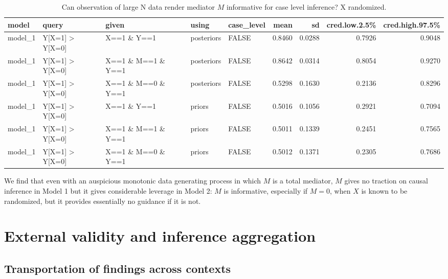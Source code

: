 \documentclass[
  12pt,
]{book}
\begin{document}
\begin{table}

\caption{\label{tab:unnamed-chunk-110}Can observation of large N data render mediator $M$ informative for case level inference? X randomized.}
\centering
\begin{tabular}[t]{l|l|l|l|l|r|r|r|r}
\hline
model & query & given & using & case\_level & mean & sd & cred.low.2.5\% & cred.high.97.5\%\\
\hline
model\_1 & Y[X=1] > Y[X=0] & X==1 \& Y==1 & posteriors & FALSE & 0.8460 & 0.0288 & 0.7926 & 0.9048\\
\hline
model\_1 & Y[X=1] > Y[X=0] & X==1 \& M==1 \& Y==1 & posteriors & FALSE & 0.8642 & 0.0314 & 0.8054 & 0.9270\\
\hline
model\_1 & Y[X=1] > Y[X=0] & X==1 \& M==0 \& Y==1 & posteriors & FALSE & 0.5298 & 0.1630 & 0.2136 & 0.8296\\
\hline
model\_1 & Y[X=1] > Y[X=0] & X==1 \& Y==1 & priors & FALSE & 0.5016 & 0.1056 & 0.2921 & 0.7094\\
\hline
model\_1 & Y[X=1] > Y[X=0] & X==1 \& M==1 \& Y==1 & priors & FALSE & 0.5011 & 0.1339 & 0.2451 & 0.7565\\
\hline
model\_1 & Y[X=1] > Y[X=0] & X==1 \& M==0 \& Y==1 & priors & FALSE & 0.5012 & 0.1371 & 0.2305 & 0.7686\\
\hline
\end{tabular}
\end{table}

We find that even with an auspicious monotonic data generating process in which \(M\) is a total mediator, \(M\) gives no traction on causal inference in Model 1 but it gives considerable leverage in Model 2: \(M\) is informative, especially if \(M=0\), when \(X\) is known to be randomized, but it provides essentially no guidance if it is not.

\hypertarget{external-validity-and-inference-aggregation}{%
\chapter{External validity and inference aggregation}\label{external-validity-and-inference-aggregation}}

\hypertarget{transportation-of-findings-across-contexts}{%
\section{Transportation of findings across contexts}\label{transportation-of-findings-across-contexts}}
\end{document}
